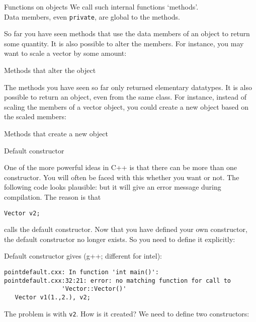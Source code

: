 \begin{slide}{Functions on objects}
  \label{sl:obj-func}
  We call such internal functions `methods'.\\
  Data members, even \lstinline{private}, are global to the methods.
\end{slide}

So far you have seen methods that use the data members of an object to
return some quantity. It is also possible to alter the members. 
For instance, you may want to scale a vector by some amount:
%

\begin{slide}{Methods that alter the object}
  \label{sl:obj-func-on}
\end{slide}

The methods you have seen so far only returned elementary
datatypes. It is also possible to return an object, even from the same
class. For instance, instead of scaling the members of a vector object, you
could create a new object based on the scaled members:
%

\begin{slide}{Methods that create a new object}
  \label{sl:obj-return}
\end{slide}

 {Default constructor}

One of the more powerful ideas in C++ is that there can be more than
one constructor. You will often be faced with this whether you want or
not. The following code looks plausible:
%
%
but it will give an error message during compilation. The reason is
that 
\begin{lstlisting}
Vector v2;
\end{lstlisting}
calls the default constructor. Now that you have defined your own
constructor, the default constructor no longer exists. So you need to
define it explicitly:
%

\begin{slide}{Default constructor}
  \label{sl:obj-def-construct}
\small
  gives (g++; different for intel):
\begin{lstlisting}
pointdefault.cxx: In function 'int main()':
pointdefault.cxx:32:21: error: no matching function for call to
                'Vector::Vector()'
   Vector v1(1.,2.), v2;
\end{lstlisting}
The problem is with \lstinline{v2}. How is it created? We need to define two constructors:
\end{slide}

